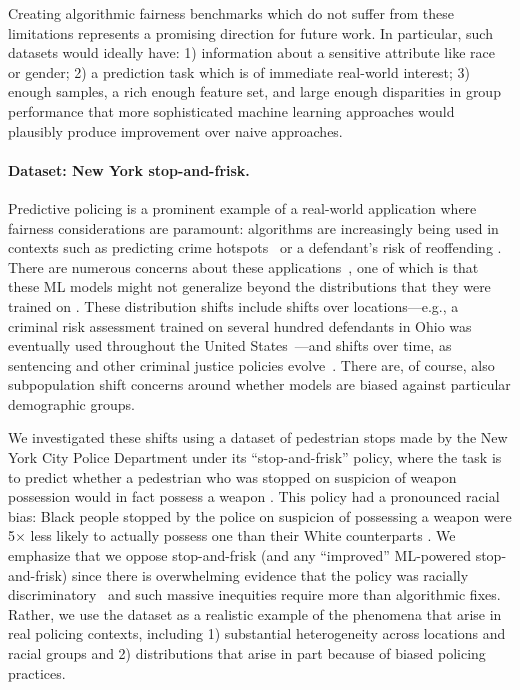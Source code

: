 Creating algorithmic fairness benchmarks which do not suffer from these limitations represents a promising direction for future work. In particular, such datasets would ideally have: 1) information about a sensitive attribute like race or gender; 2) a prediction task which is of immediate real-world interest; 3) enough samples, a rich enough feature set, and large enough disparities in group performance that more sophisticated machine learning approaches would plausibly produce improvement over naive approaches.

\paragraph{Dataset: New York stop-and-frisk.}
Predictive policing is a prominent example of a real-world application where fairness considerations are paramount:
algorithms are increasingly being used in contexts such as predicting crime hotspots~\citep{lum_predict_2016} or a defendant's risk of reoffending
\citep{larson2016we, corbett-davies_computer_2016, corbett_davies_algorithmic_2017, lum_measures_2019}.
There are numerous concerns about these applications~\citep{larson2016we, corbett-davies_computer_2016, corbett_davies_algorithmic_2017, lum_measures_2019},
one of which is that these ML models might not generalize beyond the distributions that they were trained on \citep{davies_measure_2018, slack_fairness_2019}.
These distribution shifts include shifts over locations---e.g., a criminal risk assessment trained on several hundred defendants in Ohio was eventually used throughout the United States~\citep{latessa_creation_2010}---and shifts over time, as sentencing and other criminal justice policies evolve~\citep{davies_measure_2018}.
There are, of course, also subpopulation shift concerns around whether models are biased against particular demographic groups.

We investigated these shifts using a dataset of pedestrian stops made by the New York City Police Department under its ``stop-and-frisk'' policy,
where the task is to predict whether a pedestrian who was stopped on suspicion of weapon possession would in fact possess a weapon \citep{goel_precinct_2016}.
This policy had a pronounced racial bias: Black people stopped by the police on suspicion of possessing a weapon were 5$\times$ less likely to actually possess one than their White counterparts \citep{goel_precinct_2016}.
We emphasize that we oppose stop-and-frisk (and any ``improved'' ML-powered stop-and-frisk) since there is overwhelming evidence that the policy was racially discriminatory~\citep{gelman_analysis_2007,goel_precinct_2016, pierson_fast_2018} and such massive inequities require more than algorithmic fixes.
Rather, we use the dataset as a realistic example of the phenomena that arise in real policing contexts, including 1) substantial heterogeneity across locations and racial groups and 2) distributions that arise in part because of biased policing practices.

